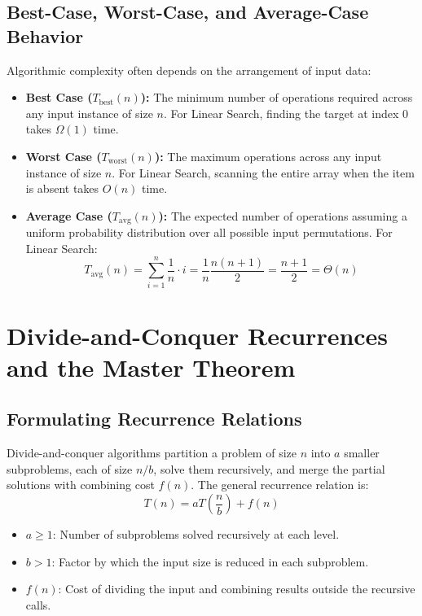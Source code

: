 \documentclass[11pt,a4paper]{article}
\begin{document}
\subsection{Best-Case, Worst-Case, and Average-Case Behavior}
Algorithmic complexity often depends on the arrangement of input data:
\begin{itemize}[itemsep=2pt]
    \item \textbf{Best Case ($T_{\text{best}}(n)$):} The minimum number of operations required across any input instance of size $n$. For Linear Search, finding the target at index $0$ takes $\Omega(1)$ time.
    \item \textbf{Worst Case ($T_{\text{worst}}(n)$):} The maximum operations across any input instance of size $n$. For Linear Search, scanning the entire array when the item is absent takes $O(n)$ time.
    \item \textbf{Average Case ($T_{\text{avg}}(n)$):} The expected number of operations assuming a uniform probability distribution over all possible input permutations. For Linear Search:
    \[
    T_{\text{avg}}(n) = \sum_{i=1}^n \frac{1}{n} \cdot i = \frac{1}{n} \frac{n(n+1)}{2} = \frac{n+1}{2} = \Theta(n)
    \]
\end{itemize}

\newpage
\section{Divide-and-Conquer Recurrences and the Master Theorem}

\subsection{Formulating Recurrence Relations}
Divide-and-conquer algorithms partition a problem of size $n$ into $a$ smaller subproblems, each of size $n/b$, solve them recursively, and merge the partial solutions with combining cost $f(n)$. The general recurrence relation is:
\[
T(n) = a T\left(\frac{n}{b}\right) + f(n)
\]
\begin{itemize}[itemsep=1pt]
    \item $a \ge 1$: Number of subproblems solved recursively at each level.
    \item $b > 1$: Factor by which the input size is reduced in each subproblem.
    \item $f(n)$: Cost of dividing the input and combining results outside the recursive calls.
\end{itemize}
\end{document}
